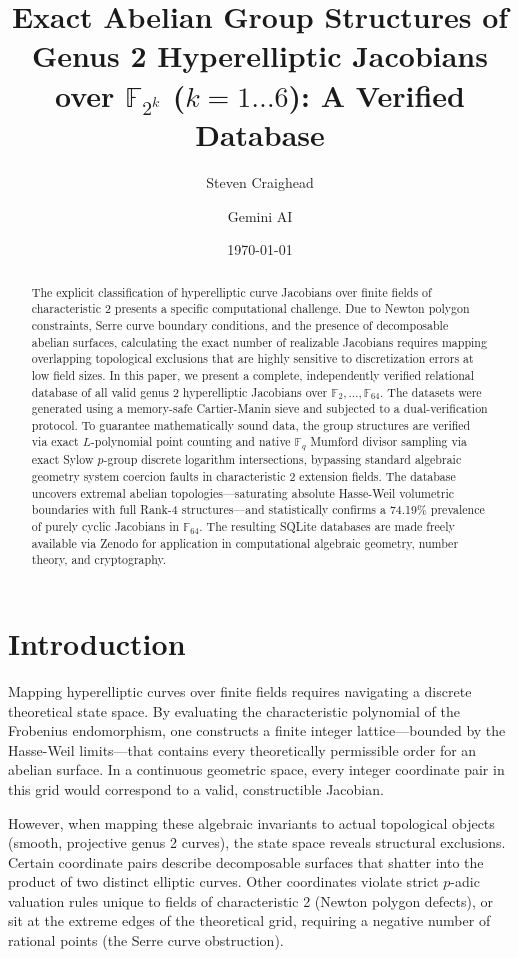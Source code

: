 \documentclass[letterpaper, 11pt]{article}
\title{Exact Abelian Group Structures of Genus 2 Hyperelliptic Jacobians over \texorpdfstring{$\mathbb{F}_{2^k}$}{F\_2\textasciicircum k} (\texorpdfstring{$k=1 \dots 6$}{k=1..6}): A Verified Database}
\author{Steven Craighead \and Gemini AI}
\date{\today}
\begin{document}
\maketitle

\begin{abstract}
The explicit classification of hyperelliptic curve Jacobians over finite fields of characteristic 2 presents a specific computational challenge. Due to Newton polygon constraints, Serre curve boundary conditions, and the presence of decomposable abelian surfaces, calculating the exact number of realizable Jacobians requires mapping overlapping topological exclusions that are highly sensitive to discretization errors at low field sizes. In this paper, we present a complete, independently verified relational database of all valid genus 2 hyperelliptic Jacobians over $\mathbb{F}_2, \dots, \mathbb{F}_{64}$. The datasets were generated using a memory-safe Cartier-Manin sieve and subjected to a dual-verification protocol. To guarantee mathematically sound data, the group structures are verified via exact $L$-polynomial point counting and native $\mathbb{F}_q$ Mumford divisor sampling via exact Sylow $p$-group discrete logarithm intersections, bypassing standard algebraic geometry system coercion faults in characteristic 2 extension fields. The database uncovers extremal abelian topologies—saturating absolute Hasse-Weil volumetric boundaries with full Rank-4 structures—and statistically confirms a 74.19\% prevalence of purely cyclic Jacobians in $\mathbb{F}_{64}$. The resulting SQLite databases are made freely available via Zenodo for application in computational algebraic geometry, number theory, and cryptography.
\end{abstract}

\section{Introduction}
Mapping hyperelliptic curves over finite fields requires navigating a discrete theoretical state space. By evaluating the characteristic polynomial of the Frobenius endomorphism, one constructs a finite integer lattice---bounded by the Hasse-Weil limits---that contains every theoretically permissible order for an abelian surface. In a continuous geometric space, every integer coordinate pair in this grid would correspond to a valid, constructible Jacobian.

However, when mapping these algebraic invariants to actual topological objects (smooth, projective genus 2 curves), the state space reveals structural exclusions. Certain coordinate pairs describe decomposable surfaces that shatter into the product of two distinct elliptic curves. Other coordinates violate strict $p$-adic valuation rules unique to fields of characteristic 2 (Newton polygon defects), or sit at the extreme edges of the theoretical grid, requiring a negative number of rational points (the Serre curve obstruction).
\end{document}
